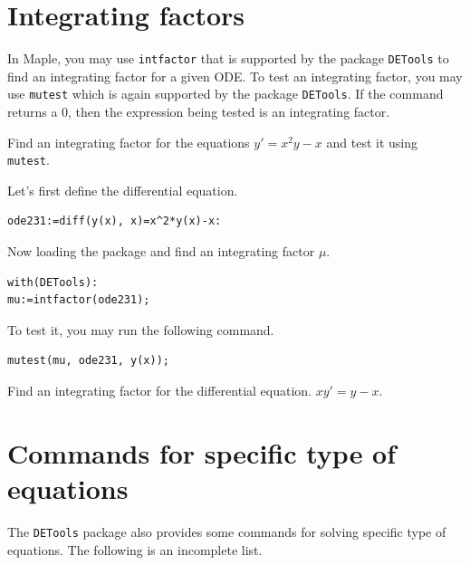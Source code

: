 \documentclass[
  12pt]{elegantbook}
\begin{document}
\hypertarget{integrating-factors}{%
\section{Integrating factors}\label{integrating-factors}}

In Maple, you may use \texttt{intfactor} that is supported by the package \texttt{DETools} to find an integrating factor for a given ODE. To test an integrating factor, you may use \texttt{mutest} which is again supported by the package \texttt{DETools}. If the command returns a 0, then the expression being tested is an integrating factor.

\begin{example}
Find an integrating factor for the equations \(y'=x^2y-x\) and test it using \texttt{mutest}.
\end{example}

\begin{solution}

Let's first define the differential equation.

\begin{verbatim}
ode231:=diff(y(x), x)=x^2*y(x)-x:
\end{verbatim}

Now loading the package and find an integrating factor \(\mu\).

\begin{verbatim}
with(DETools):
mu:=intfactor(ode231);
\end{verbatim}

To test it, you may run the following command.

\begin{verbatim}
mutest(mu, ode231, y(x));
\end{verbatim}

\end{solution}

\begin{exercise}
Find an integrating factor for the differential equation.
\(xy'=y-x.\)
\end{exercise}

\hypertarget{commands-for-specific-type-of-equations}{%
\section{Commands for specific type of equations}\label{commands-for-specific-type-of-equations}}

The \texttt{DETools} package also provides some commands for solving specific type of equations. The following is an incomplete list.
\end{document}
